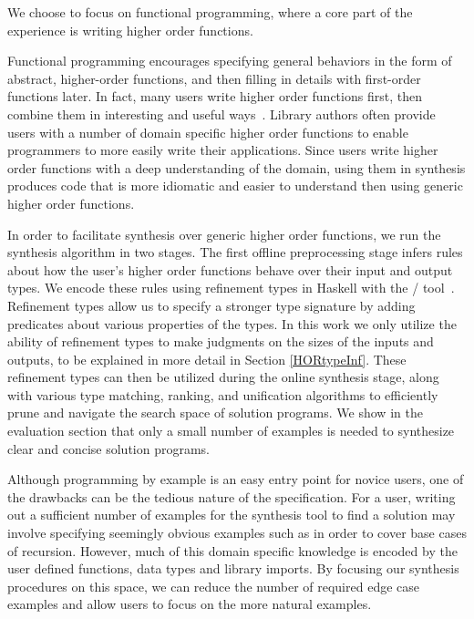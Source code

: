 We choose to focus on functional programming, where a core part of the experience is writing higher order functions.

Functional programming encourages specifying general behaviors in the form of abstract, higher-order functions, and then filling in details with first-order functions later.
In fact, many users write higher order functions first, then combine them in interesting and useful ways~\cite{Lipovaca:2011}.
Library authors often provide users with a number of domain specific higher order functions to enable programmers to more easily write their applications.
Since users write higher order functions with a deep understanding of the domain, using them in synthesis produces code that is more idiomatic and easier to understand then using generic higher order functions.

In order to facilitate synthesis over generic higher order functions, we run the synthesis algorithm in two stages.
The first offline preprocessing stage infers rules about how the user's higher order functions behave over their input and output types.
We encode these rules using refinement types in Haskell with the \lhask/ tool~\cite{DBLP:conf/haskell/VazouSJ14}.
Refinement types allow us to specify a stronger type signature by adding predicates about various properties of the types.
In this work we only utilize the ability of refinement types to make judgments on the sizes of the inputs and outputs, to be explained in more detail in Section \ref{HORtypeInf}.
These refinement types can then be utilized during the online synthesis stage, along with various type matching, ranking, and unification algorithms to efficiently prune and navigate the search space of solution programs.
We show in the evaluation section that only a small number of examples is needed to synthesize clear and concise solution programs.

Although programming by example is an easy entry point for novice users, one of the drawbacks can be the tedious nature of the specification.
For a user, writing out a sufficient number of examples for the synthesis tool to find a solution may involve
  specifying seemingly obvious examples such as \codeinline{[]->[]} in order to cover base cases of recursion.
However, much of this domain specific knowledge is encoded by the user defined functions, data types and library imports. By focusing our synthesis procedures on this space, we can reduce the number of required edge case examples and allow users to focus on the more natural examples.

